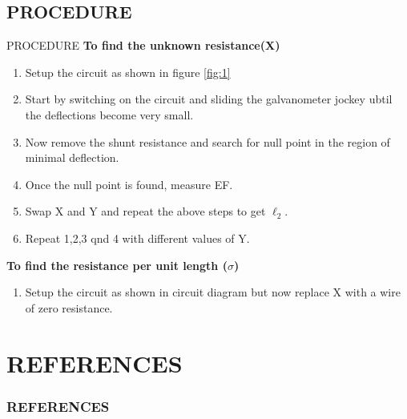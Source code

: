 \documentclass[aspectratio=169]{beamer}
\begin{document}
	\subsection{PROCEDURE}
	\begin{frame}{PROCEDURE}
		\textbf{To find the unknown resistance(X)}
		\begin{enumerate}
			\item Setup the circuit as shown in figure \ref{fig:1}
			\item Start by switching on the circuit and sliding the galvanometer jockey ubtil the deflections become very small.
			\item Now remove the shunt resistance and search for null point in the region of minimal deflection.
			\item Once the null point is found, measure EF.
			\item Swap X and Y and repeat the above steps to get $\ell_2$.
			\item Repeat 1,2,3 qnd 4 with different values of Y.
		\end{enumerate}
		\textbf{To find the resistance per unit length ($\sigma$)}
		\begin{enumerate}
			\item Setup the circuit as shown in circuit diagram but now replace X with a wire of zero resistance. 
		\end{enumerate}
	\end{frame}


\section{REFERENCES}
	\begin{frame}[t]
	\frametitle{REFERENCES}
	\end{frame}
\end{document}
